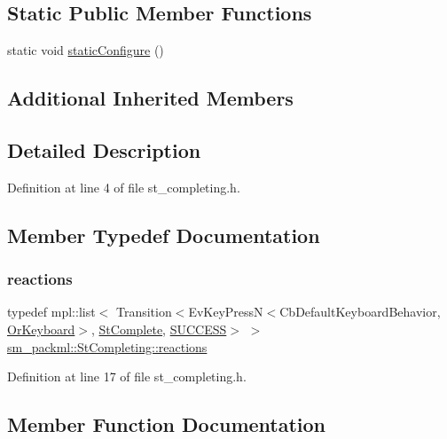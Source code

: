 \subsection*{Static Public Member Functions}
\begin{DoxyCompactItemize}
\item 
static void \hyperlink{structsm__packml_1_1StCompleting_a35bb0cd98f224670c9595b7149fc76f1}{static\+Configure} ()
\end{DoxyCompactItemize}
\subsection*{Additional Inherited Members}


\subsection{Detailed Description}


Definition at line 4 of file st\+\_\+completing.\+h.



\subsection{Member Typedef Documentation}
\mbox{\label{structsm__packml_1_1StCompleting_afaaf701cb0e25176d5ccd07dbc5c0c02}} 
\subsubsection{\texorpdfstring{reactions}{reactions}}
{\footnotesize\ttfamily typedef mpl\+::list$<$ Transition$<$Ev\+Key\+PressN$<$Cb\+Default\+Keyboard\+Behavior, \hyperlink{classsm__packml_1_1OrKeyboard}{Or\+Keyboard}$>$, \hyperlink{structsm__packml_1_1StComplete}{St\+Complete}, \hyperlink{classSUCCESS}{S\+U\+C\+C\+E\+SS}$>$ $>$ \hyperlink{structsm__packml_1_1StCompleting_afaaf701cb0e25176d5ccd07dbc5c0c02}{sm\+\_\+packml\+::\+St\+Completing\+::reactions}}



Definition at line 17 of file st\+\_\+completing.\+h.



\subsection{Member Function Documentation}
\mbox{\label{structsm__packml_1_1StCompleting_a9fc40725c89293a94fbb3dda9a982aac}} 
